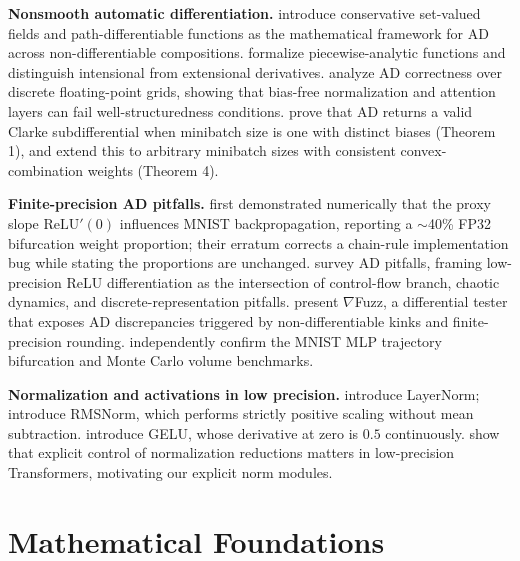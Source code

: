 \documentclass[11pt]{article}
\begin{document}
\textbf{Nonsmooth automatic differentiation.} \citet{bolte2021conservative} introduce conservative set-valued fields and path-differentiable functions as the mathematical framework for AD across non-differentiable compositions. \citet{lee2020nondifferentiable} formalize piecewise-analytic functions and distinguish intensional from extensional derivatives. \citet{lee2023machine} analyze AD correctness over discrete floating-point grids, showing that bias-free normalization and attention layers can fail well-structuredness conditions. \citet{park2024whatadcomputes} prove that AD returns a valid Clarke subdifferential when minibatch size is one with distinct biases (Theorem 1), and extend this to arbitrary minibatch sizes with consistent convex-combination weights (Theorem 4).

\textbf{Finite-precision AD pitfalls.} \citet{bertoin2021relu} first demonstrated numerically that the proxy slope $\mathrm{ReLU}'(0)$ influences MNIST backpropagation, reporting a $\sim$40\% FP32 bifurcation weight proportion; their erratum corrects a chain-rule implementation bug while stating the proportions are unchanged. \citet{hueckelheim2023pitfalls} survey AD pitfalls, framing low-precision ReLU differentiation as the intersection of control-flow branch, chaotic dynamics, and discrete-representation pitfalls. \citet{yang2023nablafuzz} present $\nabla$Fuzz, a differential tester that exposes AD discrepancies triggered by non-differentiable kinks and finite-precision rounding. \citet{martorella2023re} independently confirm the MNIST MLP trajectory bifurcation and Monte Carlo volume benchmarks.

\textbf{Normalization and activations in low precision.} \citet{ba2016layernorm} introduce LayerNorm; \citet{zhang2019rmsnorm} introduce RMSNorm, which performs strictly positive scaling without mean subtraction. \citet{hendrycks2016gelu} introduce GELU, whose derivative at zero is $0.5$ continuously. \citet{salmani2024slanc} show that explicit control of normalization reductions matters in low-precision Transformers, motivating our explicit norm modules.

\section{Mathematical Foundations}\label{sec:foundations}
\end{document}
